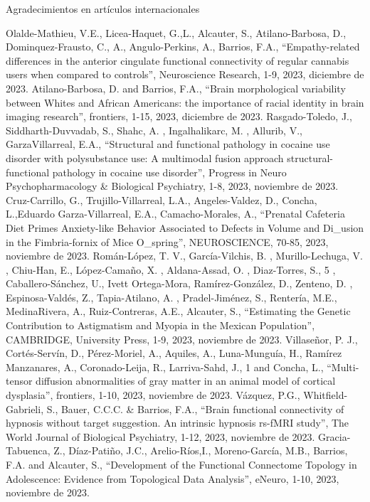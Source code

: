 Agradecimientos en artículos internacionales

Olalde-Mathieu, V.E., Licea-Haquet, G.,L., Alcauter, S., Atilano-Barbosa, D., Dominquez-Frausto, C., A., Angulo-Perkins, A., Barrios, F.A., “Empathy-related 
differences in the anterior cingulate functional connectivity of regular cannabis users when compared to controls”, Neuroscience Research, 1-9, 2023,  
diciembre de 2023.
Atilano-Barbosa, D. and Barrios, F.A., “Brain morphological variability between Whites and African Americans: the importance of racial identity in brain 
imaging research”, frontiers, 1-15, 2023,  diciembre de 2023.
Rasgado-Toledo, J., Siddharth-Duvvadab, S., Shahc, A. , Ingalhalikarc, M. , Allurib, V., GarzaVillarreal, E.A., “Structural and functional pathology in 
cocaine use disorder with polysubstance use: A multimodal fusion approach structural-functional pathology in cocaine use disorder”, Progress in Neuro 
Psychopharmacology & Biological Psychiatry, 1-8, 2023,  noviembre de 2023.
Cruz-Carrillo, G., Trujillo-Villarreal, L.A., Angeles-Valdez, D., Concha, L.,Eduardo Garza-Villarreal, E.A., Camacho-Morales, A., “Prenatal Cafeteria Diet 
Primes Anxiety-like Behavior Associated to Defects in Volume and Di_usion in the Fimbria-fornix of Mice O_spring”, NEUROSCIENCE, 70-85, 2023,  noviembre de 
2023.
Román-López, T. V., García-Vilchis, B. , Murillo-Lechuga, V. , Chiu-Han, E., López-Camaño, X. , Aldana-Assad, O. , Diaz-Torres, S., 5 , Caballero-Sánchez, 
U., Ivett Ortega-Mora, Ramírez-González, D., Zenteno, D. , Espinosa-Valdés, Z., Tapia-Atilano, A. , Pradel-Jiménez, S., Rentería, M.E., MedinaRivera, A., 
Ruiz-Contreras, A.E., Alcauter, S., “Estimating the Genetic Contribution to Astigmatism and Myopia in the Mexican Population”, CAMBRIDGE, University Press, 
1-9, 2023,  noviembre de 2023.
Villaseñor, P. J., Cortés-Servín, D., Pérez-Moriel, A., Aquiles, A., Luna-Munguía, H., Ramírez Manzanares, A., Coronado-Leija, R., Larriva-Sahd, J., 1 and 
Concha, L., “Multi-tensor diffusion abnormalities of gray matter in an animal model of cortical dysplasia”, frontiers, 1-10, 2023,  noviembre de 2023.
Vázquez, P.G., Whitfield-Gabrieli, S., Bauer, C.C.C. & Barrios, F.A., “Brain functional connectivity of hypnosis without target suggestion. An intrinsic 
hypnosis rs-fMRI study”, The World Journal of Biological Psychiatry, 1-12, 2023,  noviembre de 2023.
Gracia-Tabuenca, Z., Díaz-Patiño, J.C., Arelio-Ríos,I., Moreno-García, M.B., Barrios, F.A. and Alcauter, S., “Development of the Functional Connectome 
Topology in Adolescence: Evidence from Topological Data Analysis”, eNeuro, 1-10, 2023,  noviembre de 2023.

